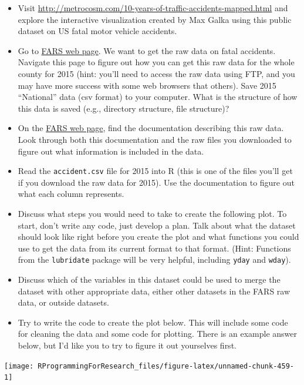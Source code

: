 \documentclass[]{book}
\providecommand{\tightlist}{%
  \setlength{\itemsep}{0pt}\setlength{\parskip}{0pt}}
\theoremstyle{definition}
\theoremstyle{definition}
\theoremstyle{definition}
\theoremstyle{remark}
\begin{document}
\begin{itemize}
\tightlist
\item
  Visit
  \url{http://metrocosm.com/10-years-of-traffic-accidents-mapped.html}
  and explore the interactive visualization created by Max Galka using
  this public dataset on US fatal motor vehicle accidents.
\item
  Go to \href{http://www.nhtsa.gov/FARS}{FARS web page}. We want to get
  the raw data on fatal accidents. Navigate this page to figure out how
  you can get this raw data for the whole county for 2015 (hint: you'll
  need to access the raw data using FTP, and you may have more success
  with some web browsers that others). Save 2015 ``National'' data (csv
  format) to your computer. What is the structure of how this data is
  saved (e.g., directory structure, file structure)?
\item
  On the
  \href{http://www.nhtsa.gov/Data/Fatality-Analysis-Reporting-System-(FARS)}{FARS
  web page}, find the documentation describing this raw data. Look
  through both this documentation and the raw files you downloaded to
  figure out what information is included in the data.
\item
  Read the \texttt{accident.csv} file for 2015 into R (this is one of
  the files you'll get if you download the raw data for 2015). Use the
  documentation to figure out what each column represents.
\item
  Discuss what steps you would need to take to create the following
  plot. To start, don't write any code, just develop a plan. Talk about
  what the dataset should look like right before you create the plot and
  what functions you could use to get the data from its current format
  to that format. (Hint: Functions from the \texttt{lubridate} package
  will be very helpful, including \texttt{yday} and \texttt{wday}).
\item
  Discuss which of the variables in this dataset could be used to merge
  the dataset with other appropriate data, either other datasets in the
  FARS raw data, or outside datasets.
\item
  Try to write the code to create the plot below. This will include some
  code for cleaning the data and some code for plotting. There is an
  example answer below, but I'd like you to try to figure it out
  yourselves first.
\end{itemize}

\begin{center}\texttt{[image: RProgrammingForResearch\_files/figure-latex/unnamed-chunk-459-1]} \end{center}
\end{document}
